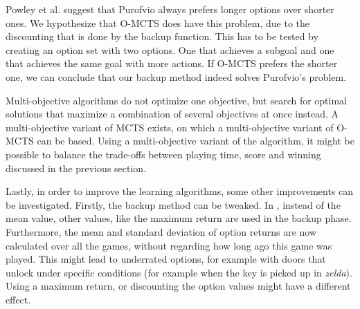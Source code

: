 Powley et al. suggest that Purofvio always prefers longer options over shorter
ones. We hypothesize that O-MCTS does have this problem, due to the discounting
that is done by the backup function.  This has to be tested by creating an
option set with two options.  One that achieves a subgoal and one that achieves
the same goal with more actions. If O-MCTS prefers the shorter one, we can
conclude that our backup method indeed solves Purofvio's problem.

Multi-objective algorithms do not optimize one objective, but search for 
optimal solutions that maximize a combination of several objectives at once
instead. A multi-objective variant of MCTS exists, on which a multi-objective
variant of O-MCTS can be based. Using a multi-objective variant of the
algorithm, it might be possible to balance the trade-offs between playing time,
score and winning discussed in the previous section. 

Lastly, in order to improve the learning algorithms, some other improvements can be
investigated. Firstly, the backup method can be tweaked. In
\cite{coulom2007efficient}, instead of the mean value, other values, like the
maximum return are used in the backup phase. Furthermore, the mean and standard
deviation of option returns are now calculated over all the games, without
regarding how long ago this game was played. This might lead to underrated
options, for example with doors that unlock under specific conditions (for
example when the key is picked up in \textit{zelda}).  Using a maximum return,
or discounting the option values might have a different effect.

